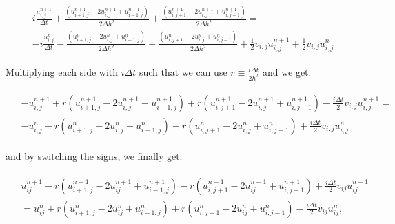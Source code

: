 \documentclass[english,notitlepage,reprint,nofootinbib]{revtex4-1}  %
\begin{document}
\begin{align}
\begin{split}
    &i \frac{u_{i,j}^{n+1}}{\Delta t} + \frac{\left( u_{i+1, j}^{n+1} - 2u_{i, j}^{n+1} + u_{i-1, j}^{n+1} \right)}{2 \Delta h^2} + \frac{\left( u_{i, j+1}^{n+1} - 2u_{i, j}^{n+1} + u_{i, j-1}^{n+1} \right)}{2 \Delta h^2} = \\
    &- i \frac{u_{i,j}^{n}}{\Delta t} - \frac{\left( u_{i+1, j}^{n} - 2u_{i, j}^{n} + u_{i-1, j}^{n} \right)}{2 \Delta h^2} - \frac{\left( u_{i, j+1}^{n} - 2u_{i, j}^{n} + u_{i, j-1}^{n} \right)}{2 \Delta h^2} + \frac{1}{2} v_{i,j} u_{i,j}^{n+1} + \frac{1}{2} v_{i,j} u_{i,j}^n
\end{split}
\end{align}

Multiplying each side with $i \Delta t$ such that we can use $r \equiv \frac{i \Delta t}{2h^2}$ and we get:

\begin{align}
\begin{split}
    &- u_{i,j}^{n+1} + r \left( u_{i+1, j}^{n+1} - 2u_{i, j}^{n+1} + u_{i-1, j}^{n+1} \right) + r \left( u_{i, j+1}^{n+1} - 2u_{i, j}^{n+1} + u_{i, j-1}^{n+1} \right) - \frac{i \Delta t}{2} v_{i,j} u_{i,j}^{n+1} = \\
    &- u_{i,j}^{n} - r \left( u_{i+1, j}^{n} - 2u_{i, j}^{n} + u_{i-1, j}^{n} \right) - r \left( u_{i, j+1}^{n} - 2u_{i, j}^{n} + u_{i, j-1}^{n} \right) + \frac{i \Delta t}{2} v_{i,j} u_{i,j}^n
\end{split}
\end{align}

and by switching the signs, we finally get:

\begin{align} \label{eq:crank}
\begin{split}
    &u_{ij}^{n+1}  -  r \left(u_{i+1,j}^{n+1} - 2u_{ij}^{n+1} + u_{i-1,j}^{n+1}\right)  -  r \left(u_{i,j+1}^{n+1} - 2u_{ij}^{n+1} + u_{i,j-1}^{n+1}\right)  +  \frac{i \Delta t}{2} v_{ij} u_{ij}^{n+1} \\
    &= u_{ij}^n  +  r \left(u_{i+1,j}^n - 2u_{ij}^n + u_{i-1,j}^n\right)  +  r \left(u_{i,j+1}^n - 2u_{ij}^n + u_{i,j-1}^n\right)  -  \frac{i \Delta t}{2} v_{ij} u_{ij}^n,
\end{split}    
\end{align}

%

	
	
\end{document}
